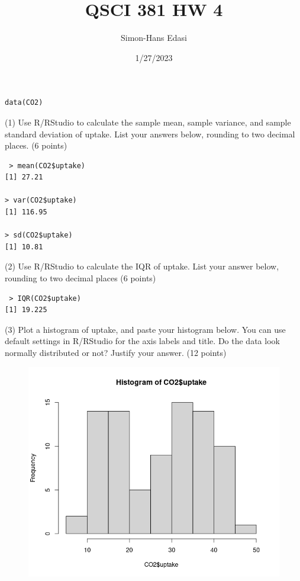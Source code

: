 \documentclass{article}
\title{QSCI 381 HW 4}
\date{1/27/2023}
\author{Simon-Hans Edasi}
\begin{document}
	\maketitle






\begin{center}
\begin{lstlisting}
data(CO2)
\end{lstlisting}
\end{center}

(1) Use R/RStudio to calculate the sample mean, sample variance, and sample standard deviation of uptake. List your answers below, rounding to two decimal places. (6 points)
\begin{center}
\begin{lstlisting}
 > mean(CO2$uptake)
[1] 27.21

> var(CO2$uptake)
[1] 116.95

> sd(CO2$uptake)
[1] 10.81
\end{lstlisting}
\end{center}



(2) Use R/RStudio to calculate the IQR of uptake. List your answer below, rounding to two decimal places (6 points)

\begin{center}
\begin{lstlisting}
 > IQR(CO2$uptake)
[1] 19.225
\end{lstlisting}
\end{center}


(3) Plot a histogram of uptake, and paste your histogram below. You can use default settings in R/RStudio for the axis labels and title. Do the data look normally distributed or not? Justify your answer. (12 points)


\begin{figure}[H]
    \includegraphics[scale = 0.5]{CO2_uptake_hist.png}
\end{figure}
\end{document}
